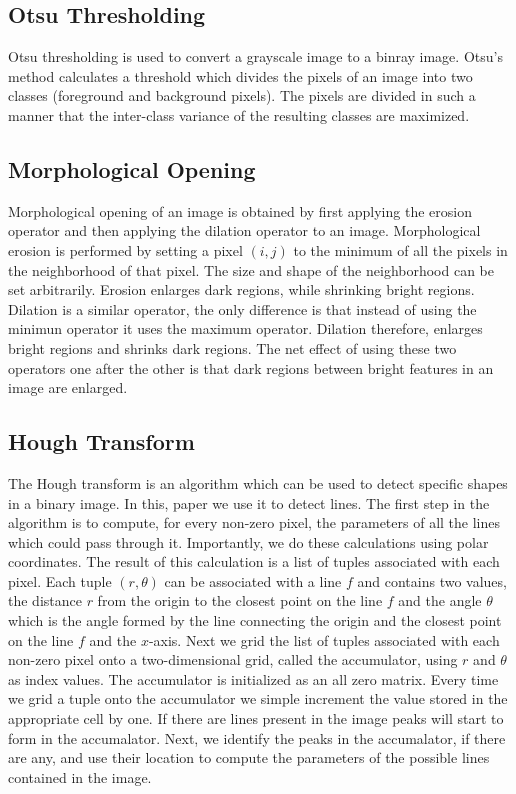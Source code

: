 \documentclass{article}
\begin{document}
\subsection{Otsu Thresholding}
Otsu thresholding is used to convert a grayscale image to a binray image. Otsu's method calculates a threshold which divides 
the pixels of an image into two classes (foreground and background pixels). The pixels are divided in such a manner that the inter-class variance 
of the resulting classes are maximized. 

\subsection{Morphological Opening}
Morphological opening of an image is obtained by first applying the erosion operator and then applying the dilation operator to an image. 
Morphological erosion is performed by setting a pixel $(i,j)$ to the minimum of all the pixels in the neighborhood of that pixel. The size 
and shape of the neighborhood can be set arbitrarily. Erosion enlarges dark regions, while shrinking bright regions. Dilation is a similar operator,
the only difference is that instead of using the minimun operator it uses the maximum operator. Dilation therefore, enlarges bright regions and shrinks dark regions.
The net effect of using these two operators one after the other is that dark regions between bright features in an image are enlarged. 

\subsection{Hough Transform}
The Hough transform is an algorithm which can be used to detect specific shapes in a binary image. In this, paper we use it to detect lines. 
The first step in the algorithm is to compute, for every non-zero pixel, the parameters of all the lines which could pass through it. Importantly, we do these calculations using polar coordinates. 
The result of this calculation is a list of tuples associated with each pixel. Each tuple $(r,\theta)$ can be associated with a line $f$ and contains two values, 
the distance $r$ from the origin to the closest point on the line $f$ and the angle $\theta$ which is the angle formed by the line 
connecting the origin and the closest point on the line $f$ and the $x$-axis. Next we grid the list of tuples associated with each non-zero pixel onto a two-dimensional 
grid, called the accumulator, using $r$ and $\theta$ as index values. The accumulator is initialized as an all zero matrix. Every time we grid a tuple onto the accumulator 
we simple increment the value stored in the appropriate cell by one. If there are lines present in the image peaks will start to form in the accumalator. Next, we 
identify the peaks in the accumalator, if there are any, and use their location to compute the parameters of the possible lines contained in the image. 
\end{document}
